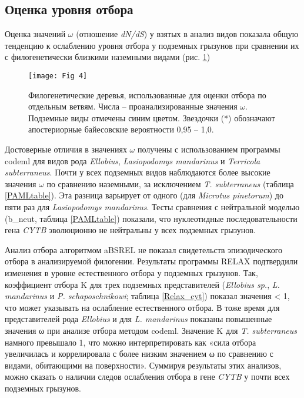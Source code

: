 \subsection{Оценка уровня отбора}
Оценка значений $\omega$ (отношение \textit{dN/dS}) у взятых в анализ видов показала общую тенденцию к ослаблению уровня отбора у подземных грызунов при сравнении их с филогенетически близкими наземными видами (рис. \ref{Tree4Selection})


\begin{figure}[h!]
	\begin{center}
		\texttt{[image: Fig 4]}
	\end{center}
	\caption{Филогенетические деревья, использованные для оценки отбора по отдельным ветвям. Числа -- проанализированные значения $\omega$. Подземные виды отмечены синим цветом. Звездочки (*) обозначают апостериорные байесовские вероятности 0,95 -- 1,0.} \label{Tree4Selection}
\end{figure}


 Достоверные отличия в значениях $\omega$ получены с использованием программы codeml для видов рода \textit{Ellobius}, \textit{Lasiopodomys mandarinus} и \textit{Terricola subterraneus}. Почти у всех подземных видов наблюдаются более высокие значения $\omega$ по сравнению наземными, за исключением \textit{T. subterraneus} (таблица \ref{PAMLtable}). Эта разница варьирует от одного (для \textit{Microtus pinetorum}) до пяти раз для \textit{Lasiopodomys mandarinus}. Тесты сравнения с нейтральной моделью (b\_neut, таблица \ref{PAMLtable}) показали, что нуклеотидные последовательности гена \textit{CYTB} эволюционно не нейтральны у всех подземных грызунов. 

Анализ отбора алгоритмом aBSREL не показал свидетельств эпизодического отбора в анализируемой филогении. Результаты программы RELAX подтвердили изменения в уровне естественного отбора у подземных грызунов. Так, коэффициент отбора K для трех подземных представителей (\textit{Ellobius sp.}, \textit{L. mandarinus} и \textit{P. schaposchnikowi}; таблица \ref{Relax_cyt}) показал значения < 1, что может указывать на ослабление естественного отбора. В тоже время для представителей рода \textit{Ellobius} и для \textit{L. mandarinus} показаны повышенные значения ω при анализе отбора методом codeml. Значение K для \textit{T. subterraneus} намного превышало 1, что можно интерпретировать как «сила отбора увеличилась и коррелировала с более низким значением ω по сравнению с видами, обитающими на поверхности». Суммируя результаты этих анализов, можно сказать о наличии следов ослабления отбора в гене \textit{CYTB} у почти всех подземных грызунов.


